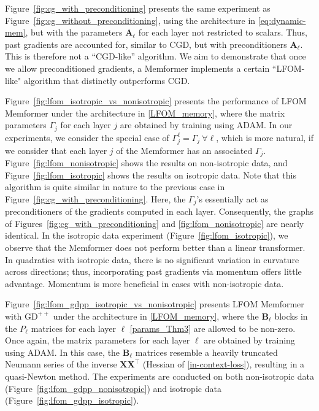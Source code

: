 \documentclass[11pt]{article}
\numberwithin{equation}{section}
\begin{document}
Figure~\ref{fig:cg_with_preconditioning} presents the same experiment as Figure~\ref{fig:cg_without_preconditioning}, using the architecture in \eqref{eq:dynamic-mem}, but with the parameters \( \mathbf{A}_\ell \) for each layer not restricted to scalars. Thus, past gradients are accounted for, similar to CGD, but with preconditioners \( \mathbf{A}_\ell \). This is therefore not a “CGD-like” algorithm. We aim to demonstrate that once we allow preconditioned gradients, a Memformer implements a certain ``LFOM-like" algorithm that distinctly outperforms CGD.

Figure~\ref{fig:lfom_isotropic_vs_nonisotropic} presents the performance of LFOM Memformer under the architecture in \eqref{LFOM_memory}, where the matrix parameters \( \Gamma_j \) for each layer \( j \) are obtained by training using ADAM. In our experiments, we consider the special case of \( \Gamma_j^\ell = \Gamma_j \ \forall \ell\), which is more natural, if we consider that each layer \(j\) of the Memformer has an associated \(\Gamma_j\). Figure~\ref{fig:lfom_nonisotropic} shows the results on non-isotropic data, and Figure~\ref{fig:lfom_isotropic} shows the results on isotropic data. Note that this algorithm is quite similar in nature to the previous case in Figure~\ref{fig:cg_with_preconditioning}. Here, the \( \Gamma_j \)'s essentially act as preconditioners of the gradients computed in each layer. Consequently, the graphs of Figures~\ref{fig:cg_with_preconditioning} and \ref{fig:lfom_nonisotropic} are nearly identical. In the isotropic data experiment (Figure~\ref{fig:lfom_isotropic}), we observe that the Memformer does not perform better than a linear transformer. In quadratics with isotropic data, there is no significant variation in curvature across directions; thus, incorporating past gradients via momentum offers little advantage. Momentum is more beneficial in cases with non-isotropic data.

Figure~\ref{fig:lfom_gdpp_isotropic_vs_nonisotropic} presents LFOM Memformer with \( \mathrm{GD}^{++} \) under the architecture in \eqref{LFOM_memory}, where the \( \mathbf{B}_\ell \) blocks in the \( P_\ell \) matrices for each layer \( \ell \) \eqref{params_Thm3} are allowed to be non-zero. Once again, the matrix parameters for each layer \( \ell \) are obtained by training using ADAM. In this case, the \( \mathbf{B}_\ell \) matrices resemble a heavily truncated Neumann series of the inverse \( \mathbf{X} \mathbf{X}^\top \) (Hessian of \eqref{in-context-loss}), resulting in a quasi-Newton method. The experiments are conducted on both non-isotropic data (Figure~\ref{fig:lfom_gdpp_nonisotropic}) and isotropic data (Figure~\ref{fig:lfom_gdpp_isotropic}).
\end{document}
